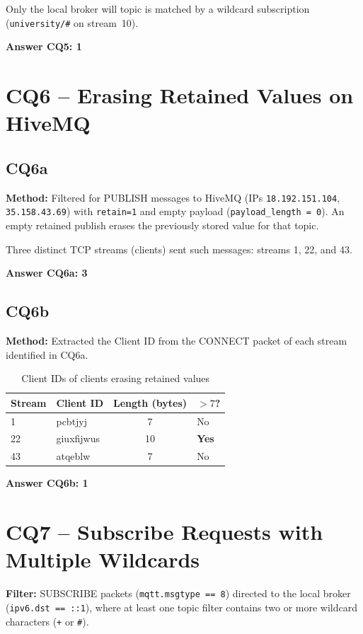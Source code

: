\documentclass[12pt,a4paper]{article}
\begin{document}
Only the local broker will topic is matched by a wildcard subscription (\texttt{university/\#} on stream~10).

\textbf{Answer CQ5: 1}

\section{CQ6 -- Erasing Retained Values on HiveMQ}

\subsection{CQ6a}

\textbf{Method:} Filtered for PUBLISH messages to HiveMQ (IPs \texttt{18.192.151.104},
\texttt{35.158.43.69}) with \texttt{retain=1} and empty payload (\texttt{payload\_length = 0}).
An empty retained publish erases the previously stored value for that topic.

Three distinct TCP streams (clients) sent such messages: streams 1, 22, and 43.

\textbf{Answer CQ6a: 3}

\subsection{CQ6b}

\textbf{Method:} Extracted the Client ID from the CONNECT packet of each stream identified in CQ6a.

\begin{table}[H]
\centering
\begin{tabular}{@{}llcl@{}}
\toprule
Stream & Client ID & Length (bytes) & $>7$? \\
\midrule
1  & pcbtjyj    & 7  & No \\
22 & giuxfijwus & 10 & \textbf{Yes} \\
43 & atqeblw    & 7  & No \\
\bottomrule
\end{tabular}
\caption{Client IDs of clients erasing retained values}
\end{table}

\textbf{Answer CQ6b: 1}

\section{CQ7 -- Subscribe Requests with Multiple Wildcards}

\textbf{Filter:} SUBSCRIBE packets (\texttt{mqtt.msgtype == 8}) directed to the local broker
(\texttt{ipv6.dst == ::1}), where at least one topic filter contains two or more
wildcard characters (\texttt{+} or \texttt{\#}).
\end{document}
